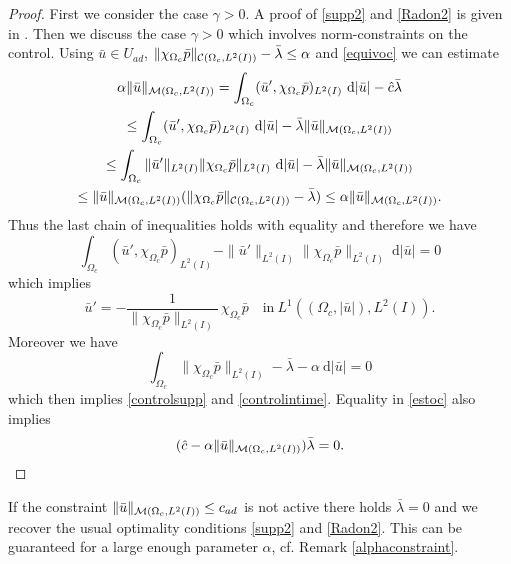 \begin{proof}
{\color{blue}First we consider the case $\gamma>0$. A proof of \eqref{supp2} and \eqref{Radon2} is given in \cite{pieper2014}.} Then we discuss the case $\gamma>0$ which involves norm-constraints on the control.
Using $\bar u\in U_{ad}$, $\|\chi_{\Omega_c}\bar p\|_{\mathcal{C}(\Omega_c, L^{2}(I))}-\bar\lambda\leq\alpha$ and \eqref{equivoc} we can estimate
\begin{multline}\label{estoc}
\alpha\|\bar u\|_{\M}=\int_{\Omega_c}(\bar u',\chi_{\Omega_c}\bar p)_{L^2(I)}~\mathrm d|\bar u|-\hat c\bar\lambda\\
\leq \int_{\Omega_c}(\bar u',\chi_{\Omega_c}\bar p)_{L^2(I)}~\mathrm d|\bar u|-\bar\lambda\|\bar u\|_{\M}\\
\leq \int_{\Omega_c}\|\bar u'\|_{L^2(I)}\|\chi_{\Omega_c}\bar p\|_{L^2(I)}~\mathrm d|\bar u|-\bar\lambda\|\bar u\|_{\M}\\
\leq\|\bar u\|_{\M}(\|\chi_{\Omega_c}\bar p\|_{\C}-\bar\lambda)\leq \alpha\|\bar u\|_{\M}.
\end{multline}
Thus the last chain of inequalities holds with equality and therefore we have
\[
\int_{\Omega_c}(\bar u',\chi_{\Omega_c}\bar p)_{L^2(I)}-\|\bar u'\|_{L^2(I)}\|\chi_{\Omega_c}\bar p\|_{L^2(I)}~\mathrm d|\bar u|=0
\]
which implies \[\bar u'=-\frac 1{\|\chi_{\Omega_c}\bar p\|_{L^2(I)}}\,\chi_{\Omega_c}\bar p\quad\text{in}~ L^1((\Omega_c,|\bar u|),L^2(I)).\]
Moreover we have
\[
\int_{\Omega_c}\|\chi_{\Omega_c}\bar p\|_{L^2(I)}-\bar\lambda-\alpha~\mathrm d|\bar u|=0
\]
which then implies \eqref{controlsupp} and \eqref{controlintime}. Equality in \eqref{estoc} also implies
\[
(\hat c-\alpha\|\bar u\|_{\mathcal{M}(\Omega_c, L^{2}(I))})\bar\lambda=0.
\]
\qquad\end{proof}

{\color{red}
\begin{remark}
If the constraint $\|\bar u\|_{\mathcal{M}(\Omega_c, L^{2}(I))}\leq c_{ad}$ is not active there holds $\bar \lambda=0$ and we recover the usual optimality conditions \eqref{supp2} and \eqref{Radon2}. This can be guaranteed for a large enough parameter $\alpha$, cf. Remark \ref{alphaconstraint}.
\end{remark}}


